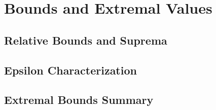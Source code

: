 \section{Bounds and Extremal Values}



\subsection{Relative Bounds and Suprema}




\subsection{Epsilon Characterization}


\subsection{Extremal Bounds Summary}

